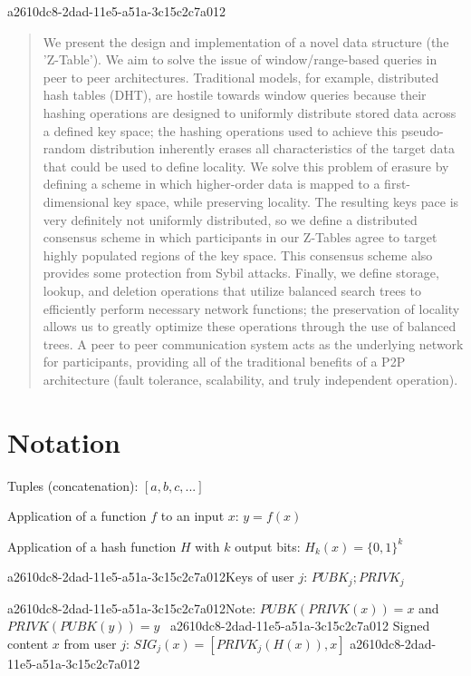 \documentclass[12pt]{article}
\begin{document}
a2610dc8-2dad-11e5-a51a-3c15c2c7a012\maketitle

\begin{abstract}
We present the design and implementation of a novel data structure (the 'Z-Table'). We aim to solve the issue of window/range-based queries in peer to peer architectures. Traditional models, for example,  distributed hash tables (DHT), are hostile towards window queries because their hashing operations are designed to uniformly distribute stored data across a defined key space; the hashing operations used to achieve this pseudo-random distribution inherently erases all characteristics of the target data that could be used to define locality. We solve this problem of erasure by defining a scheme in which higher-order data is mapped to a first-dimensional key space, while preserving locality. The resulting keys pace is very definitely not uniformly distributed, so we define a distributed consensus scheme in which participants in our Z-Tables agree to target highly populated regions of the key space. This consensus scheme also provides some protection from Sybil attacks. Finally, we define storage, lookup, and deletion operations that utilize balanced search trees to efficiently perform necessary network functions; the preservation of locality allows us to greatly optimize these operations through the use of balanced trees. A peer to peer communication system acts as the underlying network for participants, providing all of the traditional benefits of a P2P architecture (fault tolerance, scalability, and truly independent operation).
\end{abstract}

\section{Notation}

Tuples (concatenation): $[a,b,c,...]$

Application of a function $f$ to an input $x$: $y=f(x)$

Application of a hash function $H$ with $k$ output bits: $H_{k}(x) = \{0,1\}^k$

a2610dc8-2dad-11e5-a51a-3c15c2c7a012Keys of user $j$: $ PUBK_j; PRIVK_j $

a2610dc8-2dad-11e5-a51a-3c15c2c7a012Note: $PUBK(PRIVK(x)) = x$ and $PRIVK(PUBK(y)) = y$~
a2610dc8-2dad-11e5-a51a-3c15c2c7a012
Signed content $x$ from user $j$: $SIG_j(x) = \left[ PRIVK_j( H(x) ), x \right]$
a2610dc8-2dad-11e5-a51a-3c15c2c7a012
\end{document}
